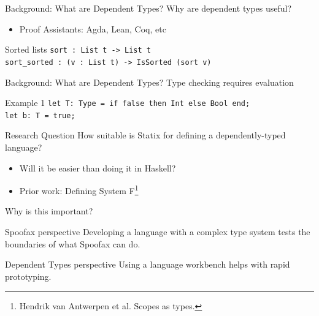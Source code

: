 \documentclass[aspectratio=43]{beamer}
\begin{document}
\begin{frame}[fragile]{Background: What are Dependent Types?}
	Why are dependent types useful?
	\begin{itemize}
		\item Proof Assistants: Agda, Lean, Coq, etc
	\end{itemize}
	
	\begin{exampleblock}{Sorted lists}
\texttt{sort : List t -> List t\\sort\_sorted : (v : List t) -> IsSorted (sort v)}
	\end{exampleblock}
\end{frame}

\begin{frame}[fragile]{Background: What are Dependent Types?}
	Type checking requires evaluation
	\begin{exampleblock}{Example 1}
		\texttt{let T: Type = if false then Int else Bool end;\\let b: T = true;}
	\end{exampleblock}
\end{frame}

\begin{frame}[fragile]{Research Question}
\large{How suitable is Statix for defining a dependently-typed language?}
\begin{itemize}
	\item Will it be easier than doing it in Haskell?
	\item Prior work: Defining System F\footnote{Hendrik van Antwerpen et al. Scopes as types.}
\end{itemize}

\end{frame}

\begin{frame}[fragile]{Why is this important?}
	\begin{block}{Spoofax perspective}
		Developing a language with a complex type system tests the boundaries of what Spoofax can do.
	\end{block}
	
	\begin{block}{Dependent Types perspective}
		Using a language workbench helps with rapid prototyping.
	\end{block}
\end{frame}
\end{document}
